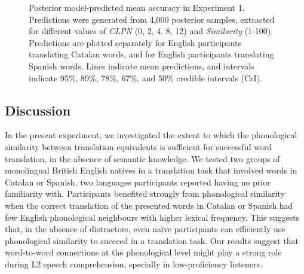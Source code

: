 \documentclass[
]{article}
\begin{document}
\begin{figure}


\caption{\label{fig-epreds-1}Posterior model-predicted mean accuracy in
Experiment 1. Predictions were generated from 4,000 posterior samples,
extracted for different values of \emph{CLPN} (0, 2, 4, 8, 12) and
\emph{Similarity} (1-100). Predictions are plotted separately for
English participants translating Catalan words, and for English
participants translating Spanish words. Lines indicate mean predictions,
and intervals indicate 95\%, 89\%, 78\%, 67\%, and 50\% credible
intervals (CrI).}

\end{figure}%

\subsection{Discussion}\label{discussion}

In the present experiment, we investigated the extent to which the
phonological similarity between translation equivalents is sufficient
for successful word translation, in the absence of semantic knowledge.
We tested two groups of monolingual British English natives in a
translation task that involved words in Catalan or Spanish, two
languages participants reported having no prior familiarity with.
Participants benefited strongly from phonological similarity when the
correct translation of the presented words in Catalan or Spanish had few
English phonological neighbours with higher lexical frequency. This
suggests that, in the absence of distractors, even naïve participants
can efficiently use phonological similarity to succeed in a translation
task. Our results suggest that word-to-word connections at the
phonological level might play a strong role during L2 speech
comprehension, specially in low-proficiency listeners.
\end{document}
